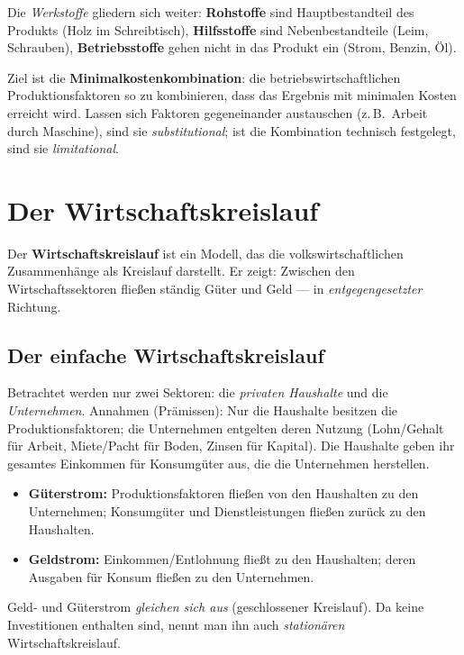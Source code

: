 \documentclass[11pt, a4paper]{article}
\begin{document}
Die \emph{Werkstoffe} gliedern sich weiter: \textbf{Rohstoffe} sind Hauptbestandteil des
Produkts (Holz im Schreibtisch), \textbf{Hilfsstoffe} sind Nebenbestandteile (Leim,
Schrauben), \textbf{Betriebsstoffe} gehen nicht in das Produkt ein (Strom, Benzin, Öl).

Ziel ist die \textbf{Minimalkostenkombination}: die betriebswirtschaftlichen
Produktionsfaktoren so zu kombinieren, dass das Ergebnis mit minimalen Kosten erreicht
wird. Lassen sich Faktoren gegeneinander austauschen (z.\,B.\ Arbeit durch Maschine), sind
sie \emph{substitutional}; ist die Kombination technisch festgelegt, sind sie
\emph{limitational}.

\section{Der Wirtschaftskreislauf}

Der \textbf{Wirtschaftskreislauf} ist ein Modell, das die volkswirtschaftlichen
Zusammenhänge als Kreislauf darstellt. Er zeigt: Zwischen den Wirtschaftssektoren fließen
ständig Güter und Geld --- in \emph{entgegengesetzter} Richtung.

\subsection{Der einfache Wirtschaftskreislauf}

Betrachtet werden nur zwei Sektoren: die \emph{privaten Haushalte} und die
\emph{Unternehmen}. Annahmen (Prämissen): Nur die Haushalte besitzen die
Produktionsfaktoren; die Unternehmen entgelten deren Nutzung (Lohn/Gehalt für Arbeit,
Miete/Pacht für Boden, Zinsen für Kapital). Die Haushalte geben ihr gesamtes Einkommen für
Konsumgüter aus, die die Unternehmen herstellen.

\begin{itemize}
  \item \textbf{Güterstrom:} Produktionsfaktoren fließen von den Haushalten zu den
    Unternehmen; Konsumgüter und Dienstleistungen fließen zurück zu den Haushalten.
  \item \textbf{Geldstrom:} Einkommen/Entlohnung fließt zu den Haushalten; deren Ausgaben
    für Konsum fließen zu den Unternehmen.
\end{itemize}

Geld- und Güterstrom \emph{gleichen sich aus} (geschlossener Kreislauf). Da keine
Investitionen enthalten sind, nennt man ihn auch \emph{stationären} Wirtschaftskreislauf.
\end{document}
